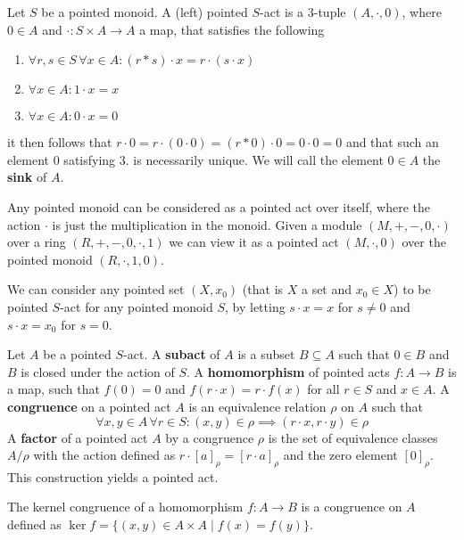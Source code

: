 \begin{definition}
    Let $S$ be a pointed monoid. A (left) pointed $S$-act is a $3$-tuple $(A,\cdot, 0)$, where $0\in A$ and $\cdot: S\times A \to A$ 
    a map, that satisfies the following
    \begin{enumerate}
        \item $\forall r,s\in S\, \forall x\in A : (r\ast s)\cdot x = r\cdot(s\cdot x)$
        \item $\forall x\in A : 1\cdot x = x$
        \item $\forall x\in A : 0\cdot x = 0$
    \end{enumerate}
    it then follows that $r\cdot 0 = r\cdot (0\cdot 0) = (r\ast 0)\cdot 0 = 0\cdot 0 = 0$ and that 
    such an element $0$ satisfying $3.$ is necessarily unique. We will call the element $0\in A$ the 
    \textbf{sink} of $A$.
\end{definition}
\begin{example}
    Any pointed monoid can be considered as a pointed act over itself, where the action $\cdot$ is just the multiplication in the monoid. 
    Given a module $(M,+,-,0,\cdot)$ over a ring $(R,+,-,0,\cdot,1)$ we can view it as a pointed act $(M,\cdot,0)$ over the pointed monoid $(R,\cdot,1,0)$.
\end{example}
\begin{example}
    We can consider any pointed set $(X,x_0)$ (that is $X$ a set and $x_0\in X$) to be pointed $S$-act for any pointed monoid $S$,
    by letting $s\cdot x = x$ for $s\neq 0$ and $s\cdot x = x_0$ for $s=0$.
\end{example}
\begin{definition}
    Let $A$ be a pointed $S$-act. A \textbf{subact} of $A$ is a subset $B\subseteq A$ such that $0\in B$ and $B$ is closed under the action of $S$. 
    A \textbf{homomorphism} of pointed acts $f: A\to B$ is a map, such that $f(0) = 0$ and $f(r\cdot x) = r\cdot f(x)$ for all $r\in S$ and $x\in A$.
    A \textbf{congruence} on a pointed act $A$ is an equivalence relation $\rho$ on $A$ such that 
    \[
        \forall x,y\in A \,\forall r \in S: (x,y)\in\rho \implies (r\cdot x, r\cdot y)\in\rho
    \]
    A \textbf{factor} of a pointed act $A$ by a congruence $\rho$ is the set of equivalence classes $A/\rho$ with the action defined as $r \cdot [a]_\rho = [r \cdot a]_\rho$ and the zero element $[0]_\rho$. 
    This construction yields a pointed act.
\end{definition}
\begin{example}
    The kernel congruence of a homomorphism $f: A\to B$ is a congruence on $A$ defined as $\ker{f} = \{(x,y)\in A\times A \mid f(x) = f(y)\}$.
\end{example}
